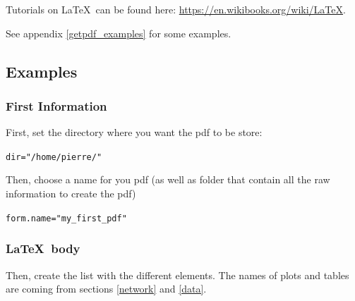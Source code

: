 \documentclass{article}\usepackage[]{graphicx}\usepackage[]{color}
\makeatletter
\newcommand{\hlstr}[1]{\textcolor[rgb]{0.192,0.494,0.8}{#1}}%
\newcommand{\hlstd}[1]{\textcolor[rgb]{0.345,0.345,0.345}{#1}}%
\newcommand{\hlkwb}[1]{\textcolor[rgb]{0.69,0.353,0.396}{#1}}%
\newenvironment{kframe}{%
 \def\at@end@of@kframe{}%
 \ifinner\ifhmode%
  \def\at@end@of@kframe{\end{minipage}}%
  \begin{minipage}{\columnwidth}%
 \fi\fi%
 \def\FrameCommand##1{\hskip\@totalleftmargin \hskip-\fboxsep
 \colorbox{shadecolor}{##1}\hskip-\fboxsep
     \hskip-\linewidth \hskip-\@totalleftmargin \hskip\columnwidth}%
 \MakeFramed {\advance\hsize-\width
   \@totalleftmargin\z@ \linewidth\hsize
   \@setminipage}}%
 {\par\unskip\endMakeFramed%
 \at@end@of@kframe}
\newenvironment{knitrout}{}{} %
\makeatother
\begin{document}
Tutorials on \LaTeX~can be found here: \url{https://en.wikibooks.org/wiki/LaTeX}.

See appendix \ref{getpdf_examples} for some examples.

\subsection{Examples}

\subsubsection{First Information}
First, set the directory where you want the pdf to be store:
\begin{knitrout}
\color{fgcolor}\begin{kframe}
\begin{alltt}
\hlstd{dir} \hlkwb{=} \hlstr{"/home/pierre/"}
\end{alltt}
\end{kframe}
\end{knitrout}

Then, choose a name for you pdf (as well as folder that contain all the raw information to create the pdf) 
\begin{knitrout}
\color{fgcolor}\begin{kframe}
\begin{alltt}
\hlstd{form.name} \hlkwb{=} \hlstr{"my_first_pdf"}
\end{alltt}
\end{kframe}
\end{knitrout}

\subsubsection{\LaTeX~body}

Then, create the list with the different elements.
The names of plots and tables are coming from sections \ref{network} and \ref{data}.
\end{document}
